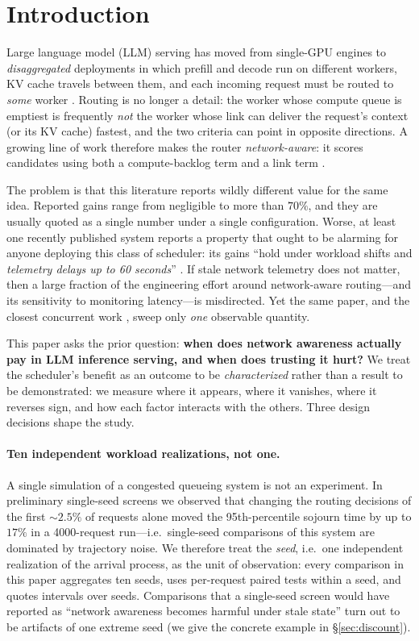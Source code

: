 \section{Introduction}
\label{sec:intro}

Large language model (LLM) serving has moved from single-GPU engines to
\emph{disaggregated} deployments in which prefill and decode run on different workers, KV cache
travels between them, and each incoming request must be routed to \emph{some} worker
\cite{distserve,splitwise,mooncake,llumnix}. Routing is no longer a detail: the worker whose
compute queue is emptiest is frequently \emph{not} the worker whose link can deliver the
request's context (or its KV cache) fastest, and the two criteria can point in opposite
directions. A growing line of work therefore makes the router \emph{network-aware}: it scores
candidates using both a compute-backlog term and a link term
\cite{cassini,vclos,helix,netkv,aegis,gensched}.

The problem is that this literature reports wildly different value for the same idea.
Reported gains range from negligible to more than $70\%$, and they are usually quoted as a
single number under a single configuration. Worse, at least one recently published system
reports a property that ought to be alarming for anyone deploying this class of scheduler:
its gains ``hold under workload shifts and \emph{telemetry delays up to 60 seconds}''
\cite{aegis}. If stale network telemetry does not matter, then a large fraction of the
engineering effort around network-aware routing---and its sensitivity to monitoring
latency---is misdirected. Yet the same paper, and the closest concurrent work
\cite{netkv}, sweep only \emph{one} observable quantity.

This paper asks the prior question: \textbf{when does network awareness actually pay in LLM
inference serving, and when does trusting it hurt?} We treat the scheduler's benefit as an
outcome to be \emph{characterized} rather than a result to be demonstrated: we measure where it
appears, where it vanishes, where it reverses sign, and how each factor interacts with the
others. Three design decisions shape the study.

\paragraph{Ten independent workload realizations, not one.}
A single simulation of a congested queueing system is not an experiment. In preliminary
single-seed screens we observed that changing the routing decisions of the first $\sim2.5\%$ of
requests alone moved the 95th-percentile sojourn time by up to $17\%$ in a 4000-request
run---i.e.~single-seed comparisons of this system are dominated by trajectory noise. We therefore
treat the \emph{seed}, i.e.~one independent realization of the arrival process, as the unit of
observation: every comparison in this paper aggregates ten seeds, uses per-request paired tests
within a seed, and quotes intervals over seeds. Comparisons that a single-seed screen would have
reported as ``network awareness becomes harmful under stale state'' turn out to be artifacts of
one extreme seed (we give the concrete example in \S\ref{sec:discount}).

